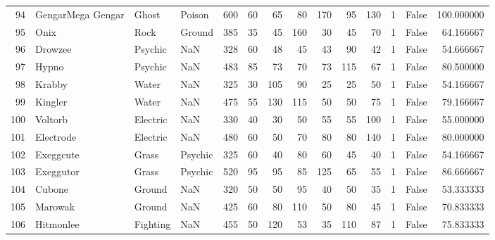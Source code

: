 \begin{tabular}{rlllrrrrrrrrlr}
  94 &          GengarMega Gengar &     Ghost &    Poison &    600 &   60 &      65 &       80 &      170 &       95 &    130 &           1 &      False &  100.000000 \\
  95 &                       Onix &      Rock &    Ground &    385 &   35 &      45 &      160 &       30 &       45 &     70 &           1 &      False &   64.166667 \\
  96 &                    Drowzee &   Psychic &       NaN &    328 &   60 &      48 &       45 &       43 &       90 &     42 &           1 &      False &   54.666667 \\
  97 &                      Hypno &   Psychic &       NaN &    483 &   85 &      73 &       70 &       73 &      115 &     67 &           1 &      False &   80.500000 \\
  98 &                     Krabby &     Water &       NaN &    325 &   30 &     105 &       90 &       25 &       25 &     50 &           1 &      False &   54.166667 \\
  99 &                    Kingler &     Water &       NaN &    475 &   55 &     130 &      115 &       50 &       50 &     75 &           1 &      False &   79.166667 \\
 100 &                    Voltorb &  Electric &       NaN &    330 &   40 &      30 &       50 &       55 &       55 &    100 &           1 &      False &   55.000000 \\
 101 &                  Electrode &  Electric &       NaN &    480 &   60 &      50 &       70 &       80 &       80 &    140 &           1 &      False &   80.000000 \\
 102 &                  Exeggcute &     Grass &   Psychic &    325 &   60 &      40 &       80 &       60 &       45 &     40 &           1 &      False &   54.166667 \\
 103 &                  Exeggutor &     Grass &   Psychic &    520 &   95 &      95 &       85 &      125 &       65 &     55 &           1 &      False &   86.666667 \\
 104 &                     Cubone &    Ground &       NaN &    320 &   50 &      50 &       95 &       40 &       50 &     35 &           1 &      False &   53.333333 \\
 105 &                    Marowak &    Ground &       NaN &    425 &   60 &      80 &      110 &       50 &       80 &     45 &           1 &      False &   70.833333 \\
 106 &                  Hitmonlee &  Fighting &       NaN &    455 &   50 &     120 &       53 &       35 &      110 &     87 &           1 &      False &   75.833333 \\

\end{tabular}
